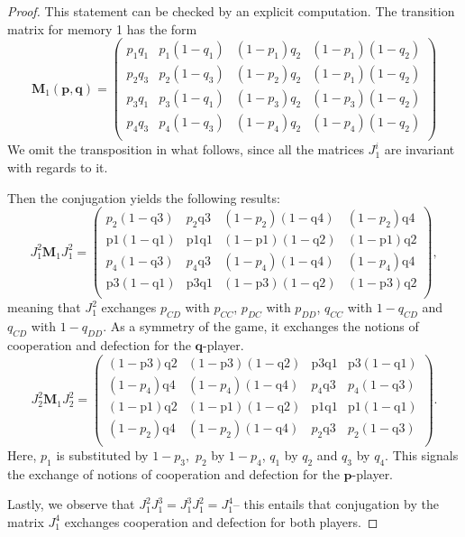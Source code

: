 \documentclass{article}
\def\p{\mathbf{p}}
\def\Mb{\mathbf{M}}
\def\q{\mathbf{q}}
\theoremstyle{definition}
\numberwithin{equation}{section}
\begin{document}
    \begin{proof}
        This statement can be checked by an explicit computation. The transition matrix for memory 1 has the form
        \[
        \Mb_1(\p,\q) = \begin{pmatrix}
            p_1 q_1& p_1(1-q_1)& (1-p_1)q_2& (1-p_1)(1-q_2)\\
             p_2 q_3& p_2(1-q_3)& (1-p_2)q_2& (1-p_1)(1-q_2)\\
              p_3 q_1& p_3(1-q_1)& (1-p_3)q_2& (1-p_3)(1-q_2)\\
                p_4 q_3& p_4(1-q_3)& (1-p_4)q_2& (1-p_4)(1-q_2)\\
        \end{pmatrix}
        \]
       We omit the transposition in what follows, since all the matrices $J_1^i$ are invariant with regards to it. 
        
    Then the conjugation yields the following  results:
        \[
        J_1^2\Mb_1J_1^2 = \left(
\begin{array}{cccc}
 p_2 (1-\text{q3}) & p_2 \text{q3} & (1-p_2) (1-\text{q4}) & (1-p_2) \text{q4} \\
 \text{p1} (1-\text{q1}) & \text{p1} \text{q1} & (1-\text{p1}) (1-\text{q2}) & (1-\text{p1}) \text{q2} \\
 p_4 (1-\text{q3}) & p_4 \text{q3} & (1-p_4) (1-\text{q4}) & (1-p_4) \text{q4} \\
 \text{p3} (1-\text{q1}) & \text{p3} \text{q1} & (1-\text{p3}) (1-\text{q2}) & (1-\text{p3}) \text{q2} \\
\end{array}
\right),
        \]
        meaning that $J_1^2$  exchanges $p_{CD}$ with  $p_{CC}$, $p_{DC}$ with $p_{DD}$, $q_{CC}$ with $1-q_{CD}$ and $q_{CD}$ with $1-q_{DD}$. As a symmetry of the game, it exchanges the notions of cooperation and defection for the  $\q$-player. 
\[
        J_2^2\Mb_1J_2^2 = 
\left(
\begin{array}{cccc}
 (1-\text{p3}) \text{q2} & (1-\text{p3}) (1-\text{q2}) & \text{p3} \text{q1} & \text{p3} (1-\text{q1}) \\
 (1-p_4) \text{q4} & (1-p_4) (1-\text{q4}) & p_4 \text{q3} & p_4 (1-\text{q3}) \\
 (1-\text{p1}) \text{q2} & (1-\text{p1}) (1-\text{q2}) & \text{p1} \text{q1} & \text{p1} (1-\text{q1}) \\
 (1-p_2) \text{q4} & (1-p_2) (1-\text{q4}) & p_2 \text{q3} & p_2 (1-\text{q3}) \\
\end{array}
\right).        \]
        Here, $p_1$ is substituted by $1-p_3, $ $p_2$ by $1-p_4$, $q_1$ by $q_2$ and $q_3$ by $q_4$. This signals the  exchange of notions of cooperation and defection for the $\p$-player. 
        
 Lastly, we observe that $J_1^2J_1^3 = J_1^3J_1^2 = J_1^4$-- this entails that conjugation by the matrix $J_1^4$ exchanges cooperation and defection for both players.
    \end{proof}
   
\end{document}
